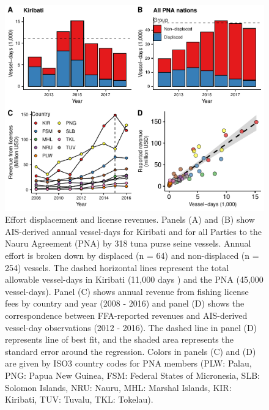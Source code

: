 \documentclass[12pt]{article}
\begin{document}
\begin{figure}[htbp]
\centering
\includegraphics{img/empirical.pdf}
\caption{\label{fig:empirical}Effort displacement and license revenues. Panels (A) and (B) show AIS-derived annual vessel-days for Kiribati and for all Parties to the Nauru Agreement (PNA) by 318 tuna purse seine vessels. Annual effort is broken down by displaced (n = 64) and non-displaced (n = 254) vessels. The dashed horizontal lines represent the total allowable vessel-days in Kiribati (11,000 days \cite{yeeting2018stabilising}) and the PNA (45,000 vessel-days). Panel (C) shows annual revenue from fishing license fees by country and year (2008 - 2016) and panel (D) shows the correspondence between FFA-reported revenues and AIS-derived vessel-day observations (2012 - 2016). The dashed line in panel (D) represents line of best fit, and the shaded area represents the standard error around the regression. Colors in panels (C) and (D) are given by ISO3 country codes for PNA members (PLW: Palau, PNG: Papua New Guinea, FSM: Federal States of Micronesia, SLB: Solomon Islands, NRU: Nauru, MHL: Marshal Islands, KIR: Kiribati, TUV: Tuvalu, TKL: Tokelau).}
\end{figure}
\end{document}
